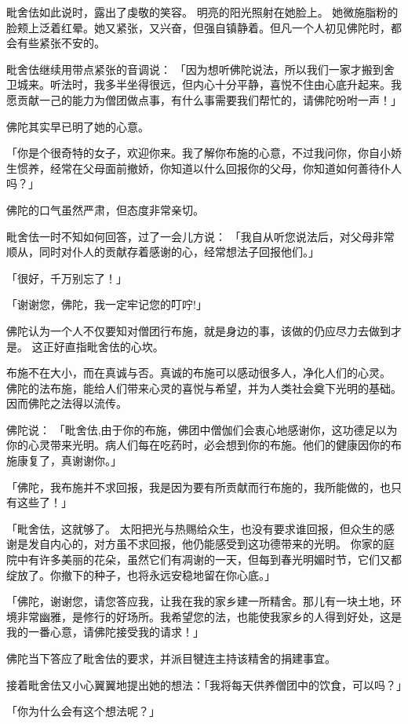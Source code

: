 \documentclass[twoside,openany]{book}
\begin{document}
毗舍佉如此说时，露出了虔敬的笑容。
明亮的阳光照射在她脸上。
她微施脂粉的脸颊上泛着红晕。她又紧张，又兴奋，但强自镇静着。但凡一个人初见佛陀时，都会有些紧张不安的。

毗舍佉继续用带点紧张的音调说：
「因为想听佛陀说法，所以我们一家才搬到舍卫城来。听法时，我多半坐得很远，但内心十分平静，喜悦不住由心底升起来。我愿贡献一己的能力为僧团做点事，有什么事需要我们帮忙的，请佛陀吩咐一声！」

佛陀其实早已明了她的心意。

「你是个很奇特的女子，欢迎你来。我了解你布施的心意，不过我问你，你自小娇生惯养，经常在父母面前撤娇，你知道以什么回报你的父母，你知道如何善待仆人吗？」

佛陀的口气虽然严肃，但态度非常亲切。

毗舍佉一时不知如何回答，过了一会儿方说：
「我自从听您说法后，对父母非常顺从，同时对仆人的贡献存着感谢的心，经常想法子回报他们。」

「很好，千万别忘了！」

「谢谢您，佛陀，我一定牢记您的叮咛!」

佛陀认为一个人不仅要知对僧团行布施，就是身边的事，该做的仍应尽力去做到才是。
这正好直指毗舍佉的心坎。

布施不在大小，而在真诚与否。真诚的布施可以感动很多人，净化人们的心灵。
佛陀的法布施，能给人们带来心灵的喜悦与希望，并为人类社会奠下光明的基础。
因而佛陀之法得以流传。

佛陀说：
「毗舍佉,由于你的布施，佛团中僧伽们会衷心地感谢你，这功德足以为你的心灵带来光明。病人们每在吃药时，必会想到你的布施。他们的健康因你的布施康复了，真谢谢你。」

「佛陀，我布施并不求回报，我是因为要有所贡献而行布施的，我所能做的，也只有这些了！」

「毗舍佉，这就够了。
太阳把光与热赐给众生，也没有要求谁回报，但众生的感谢是发自内心的，对方虽不求回报，他仍能感受到这功德带来的光明。
你家的庭院中有许多美丽的花朵，虽然它们有凋谢的一天，但每到春光明媚时节，它们又都绽放了。你撤下的种子，也将永远安稳地留在你心底。」

「佛陀，谢谢您，请您答应我，让我在我的家乡建一所精舍。那儿有一块土地，环境非常幽雅，是修行的好场所。我希望您的法，也能使我家乡的人得到好处，这是我的一番心意，请佛陀接受我的请求！」

佛陀当下答应了毗舍佉的要求，并派目犍连主持该精舍的捐建事宜。

接着毗舍佉又小心翼翼地提出她的想法：「我将每天供养僧团中的饮食，可以吗？」

「你为什么会有这个想法呢？」
\end{document}
